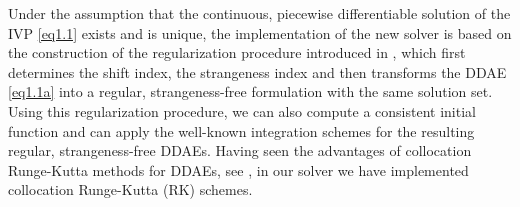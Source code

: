 \documentclass[final,reqno]{siamltex}
\begin{document}
Under the assumption that the continuous, piecewise differentiable solution of the IVP \eqref{eq1.1} exists and is unique, the implementation of the new 
solver is based on the construction of the regularization procedure introduced in \cite{HaM14}, which first determines the shift index, 
the strangeness index and then transforms the DDAE \eqref{eq1.1a} into a regular, strangeness-free formulation with the same solution set. 
Using this regularization procedure, we can also compute a consistent initial function and can apply the well-known integration schemes for the 
resulting regular, strangeness-free DDAEs. 
Having seen the advantages of collocation Runge-Kutta methods for DDAEs, see \cite{GugH01,GugH07}, in our solver we have implemented collocation 
Runge-Kutta (RK) schemes. 
%
\end{document}
